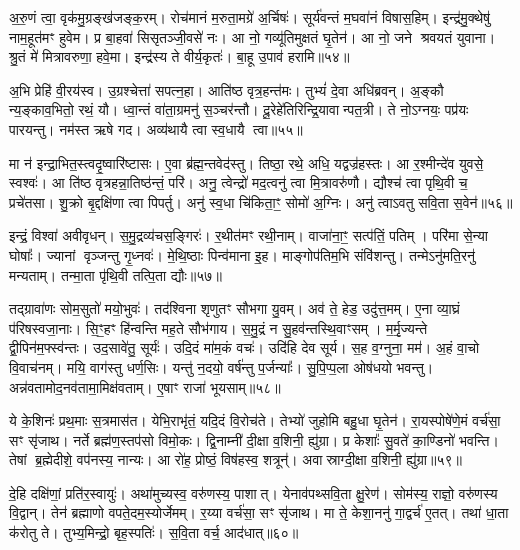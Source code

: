 अ॒रु॒णं त्वा॒ वृक॑मु॒ग्रङ्ख॑जङ्क॒रम्।
रोच॑मानं म॒रुता॒मग्रे॑ अ॒र्चिषः॑।
सूर्य॑वन्तं म॒घवा॑नं विषास॒हिम्।
इन्द्र॑मु॒क्थेषु॑ नाम॒हूत॑मꣳ हुवेम।
प्र बा॒हवा॑ सिसृतञ्जी॒वसे॑ नः।
आ नो॒ गव्यू॑तिमुक्षतं घृ॒तेन॑।
आ नो॒ जने श्रवयतं युवाना।
श्रु॒तं मे॑ मित्रावरुणा॒ हवे॒मा।
इन्द्र॑स्य ते वीर्य॒कृतः॑।
बा॒हू उ॒पाव॑ हरामि॥५४॥\anuvakamend[ब॒भू॒वाव्य॑य॒त्तेने॒मम॑ग्न इ॒ह वर्च॑सा॒ सम॑ङ्ग्धि॒ वैया॒घ्रेऽधि॑ राष्ट्र॒वर्ध॑नः॒ पाङ्क्ते॑न॒ छन्द॑सो॒पाव॑हरामि]

अ॒भि प्रेहि॑ वी॒रय॑स्व।
उ॒ग्रश्चेत्ता॑ सपत्न॒हा।
आति॑ष्ठ वृत्र॒हन्त॑मः।
तुभ्यं॑ दे॒वा अधि॑ब्रवन्।
अ॒ङ्कौ न्य॒ङ्काव॒भितो॒ रथं॒ यौ।
ध्वा॒न्तं वा॑ता॒ग्रमनु॑ स॒ञ्चर॑न्तौ।
दू॒रेहे॑तिरिन्द्रि॒यावान्पत॒त्री।
ते नो॒\-ऽग्नयः॒ पप्र॑यः पारयन्तु।
नम॑स्त ऋषे गद।
अव्य॑थायै त्वा स्व॒धायै त्वा॥५५॥

मा न॑ इन्द्रा॒भित॒स्त्वदृ॒ष्वारि॑ष्टासः।
ए॒वा ब्र॑ह्म॒न्तवेद॑स्तु।
तिष्ठा॒ रथे॒ अधि॒ यद्वज्र॑हस्तः।
आ र॒श्मीन्दे॑व युवसे॒ स्वश्वः॑।
आ ति॑ष्ठ वृत्रहन्ना॒तिष्ठ॑न्तं॒ परि॑।
अनु॒ त्वेन्द्रो॑ मद॒त्वनु॑ त्वा मि॒त्रावरु॑णौ।
द्यौश्च॑ त्वा पृथि॒वी च॒ प्रचे॑तसा।
शु॒क्रो बृ॒द्दक्षि॑णा त्वा पिपर्तु।
अनु॑ स्व॒धा चि॑किता॒ꣳ॒ सोमो॑ अ॒ग्निः।
अनु॑ त्वाऽवतु सवि॒ता स॒वेन॑॥५६॥

इन्द्रं॒ विश्वा॑ अवीवृधन्।
स॒मु॒द्रव्य॑चस॒ङ्गिरः॑।
र॒थीत॑मꣳ रथी॒नाम्।
वाजा॑ना॒ꣳ॒ सत्प॑तिं॒ पतिम्।
परि॑मा से॒न्या घोषाः᳚।
ज्यानां वृञ्जन्तु गृ॒ध्नवः॑।
मे॒थि॒ष्ठाः पिन्व॑माना इ॒ह।
माङ्गोप॑तिम॒भि संवि॑शन्तु।
तन्मे\-ऽनु॑मति॒रनु॑ मन्यताम्।
तन्मा॒ता पृ॑थि॒वी तत्पि॒ता द्यौः॥५७॥

तद्ग्रावा॑णः सोम॒सुतो॑ मयो॒भुवः॑।
तद॑श्विना शृणुतꣳ सौभगा यु॒वम्।
अव॑ ते॒ हेड॒ उदु॑त्त॒मम्।
ए॒ना व्या॒घ्रं प॑रिषस्वजा॒नाः।
सि॒ꣳ॒हꣳ हि॑न्वन्ति मह॒ते सौभ॑गाय।
स॒मु॒द्रं न सु॒हव॑न्तस्थि॒वाꣳसम्।
म॒र्मृ॒ज्यन्ते द्वी॒पिन॑म॒फ्स्व॑न्तः।
उद॒सावे॑तु॒ सूर्यः॑।
उदि॒दं मा॑म॒कं वचः॑।
उदि॑हि देव सूर्य।
स॒ह व॒ग्नुना॒ मम॑।
अ॒हं वा॒चो वि॒वाच॑नम्।
मयि॒ वाग॑स्तु धर्ण॒सिः।
यन्तु॑ न॒दयो॒ वर्\mbox{}ष॑न्तु प॒र्जन्याः᳚।
सु॒पि॒प्प॒ला ओष॑धयो भवन्तु।
अन्न॑वतामोद॒नव॑तामा॒मिक्ष॑वताम्।
ए॒षाꣳ राजा॑ भूयसाम्॥५८॥\anuvakamend[स्व॒धायै त्वा स॒वेन॒ द्यौः सूर्य स॒प्त च॑]

ये के॒शिनः॑ प्रथ॒माः स॒त्रमास॑त।
येभि॒राभृ॑तं॒ यदि॒दं वि॒रोच॑ते।
तेभ्यो॑ जुहोमि बहु॒धा घृ॒तेन॑।
रा॒यस्पोषे॑णे॒मं वर्च॑सा॒ सꣳ सृ॑जाथ।
नर्ते ब्रह्म॑ण॒स्तप॑सो विमो॒कः।
द्वि॒नाम्नी॑ दी॒क्षा व॒शिनी॒ ह्यु॑ग्रा।
प्र केशाः᳚ सु॒वते॑ का॒ण्डिनो॑ भवन्ति।
तेषां ब्र॒ह्मेदीशे॒ वप॑नस्य॒ नान्यः।
आ रो॑ह॒ प्रोष्ठं॒ विष॑हस्व॒ शत्रून्॑।
अवास्राग्दी॒क्षा व॒शिनी॒ ह्यु॑ग्रा॥५९॥

दे॒हि दक्षि॑णां॒ प्रति॑र॒स्वायुः॑।
अथा॑मुच्यस्व॒ वरु॑णस्य॒ पाशात्।
येनाव॑पथ्सवि॒ता क्षु॒रेण॑।
सोम॑स्य॒ राज्ञो॒ वरु॑णस्य वि॒द्वान्।
तेन॑ ब्रह्माणो वपते॒दम॒स्योर्जेमम्।
र॒य्या वर्च॑सा॒ सꣳ सृ॑जाथ।
मा ते॒ केशा॒ननु॑ गा॒द्वर्च॑ ए॒तत्।
तथा॑ धा॒ता क॑रोतु ते।
तुभ्य॒मिन्द्रो॒ बृह॒स्पतिः॑।
स॒वि॒ता वर्च॒ आद॑धात्॥६०॥

